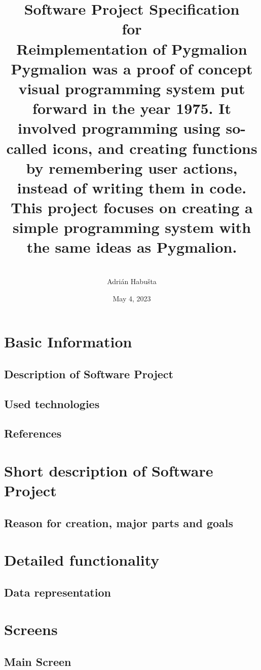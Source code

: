\documentclass[r]{article}
\author{%
    \vspace{3.5mm}\currentversion\\
    Adrián Habušta
    }
\title{%
    \LARGE Software Project Specification \\
    \Large for \\
    \Huge Reimplementation of Pygmalion \\\vspace{10mm}
    \normalsize Pygmalion was a proof of concept visual programming system
    put forward in the year 1975. It involved programming using so-called
    icons, and creating functions by remembering user actions, instead of
    writing them in code. This project focuses on creating a simple programming
    system with the same ideas as Pygmalion.
    }
\date{May 4, 2023}
\begin{document}
    \begin{titlepage}
        \maketitle
    \end{titlepage}

    \tableofcontents
    \newpage

    \section{Basic Information}
        \subsection{Description of Software Project}

        \subsection{Used technologies}

        \subsection{References}


    \section{Short description of Software Project}
        \subsection{Reason for creation, major parts and goals}


    \section{Detailed functionality}
        \subsection{Data representation}


    \section{Screens}
        \subsection{Main Screen}
\end{document}
